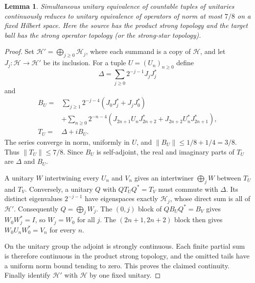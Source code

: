 \documentclass[11pt]{article}
\newtheorem{lemma}[theorem]{Lemma}
\theoremstyle{definition}
\begin{document}
\begin{lemma}\label{lem:tuple-coding}
Simultaneous unitary equivalence of countable tuples of unitaries
continuously reduces to unitary equivalence of operators of norm at most
$7/8$ on a fixed Hilbert space. Here the source has the product strong
topology and the target ball has the strong operator topology (or the
strong-star topology).
\end{lemma}
\begin{proof}
Set $\mathcal H'=\bigoplus_{j\ge0}\mathcal H_j$, where each summand is a
copy of $\mathcal H$, and let $J_j:\mathcal H\to\mathcal H'$ be its
inclusion. For a tuple $U=(U_n)_{n\ge0}$ define
\[
 \Delta=\sum_{j\ge0}2^{-j-1}J_jJ_j^*
\]
and
\begin{align*}
 B_U={}&\sum_{j\ge1}2^{-j-4}(J_0J_j^*+J_jJ_0^*)\\
 &+\sum_{n\ge0}2^{-n-4}
 (J_{2n+1}U_nJ_{2n+2}^*+J_{2n+2}U_n^*J_{2n+1}^*),\\
 T_U={}&\Delta+iB_U.
\end{align*}
The series converge in norm, uniformly in $U$, and
$\|B_U\|\le1/8+1/4=3/8$. Thus $\|T_U\|\le7/8$.
Since $B_U$ is self-adjoint, the real and imaginary parts of $T_U$
are $\Delta$ and $B_U$.

A unitary $W$ intertwining every $U_n$ and $V_n$ gives an intertwiner
$\bigoplus_j W$ between $T_U$ and $T_V$.
Conversely, a unitary $Q$ with $QT_UQ^*=T_V$ must commute with $\Delta$.
Its distinct eigenvalues $2^{-j-1}$ have eigenspaces exactly
$\mathcal H_j$, whose direct sum is all of $\mathcal H'$. Consequently
$Q=\bigoplus_j W_j$. The $(0,j)$ block of $QB_UQ^*=B_V$ gives
$W_0W_j^*=I$, so $W_j=W_0$ for all $j$. The $(2n+1,2n+2)$ block then
gives $W_0U_nW_0^*=V_n$ for every $n$.

On the unitary group the adjoint is strongly continuous. Each finite
partial sum is therefore continuous in the product strong topology,
and the omitted tails have a uniform norm bound tending to zero.
This proves the claimed continuity. Finally identify $\mathcal H'$
with $\mathcal H$ by one fixed unitary.
\end{proof}
\end{document}
